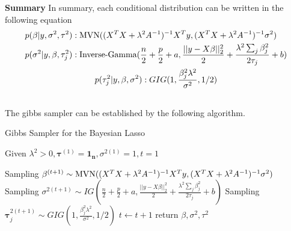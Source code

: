 \textbf{Summary}
In summary, each conditional distribution can be written in the following equation
\begin{equation}
	\label{eq:lassoposteriorsummary}
	\begin{multlined}
		p(\beta |y,\sigma^2,\tau^2): \textnormal{MVN}((X^TX+\lambda^2A^{-1})^{-1}X^Ty,(X^TX+\lambda^2A^{-1})^{-1}\sigma^2)\\
		p(\sigma^2 |y,\beta,\tau_j^2):\textnormal{Inverse-Gamma}(\frac{n}{2}+\frac{p}{2}+a,\frac{||y-X\beta||_2^2}{2}+\frac{\lambda^2\sum_j{\beta_j^2}}{2\tau_j}+b)\\	
		p(\tau_j^2|y,\beta,\sigma^2): GIG(1,\frac{\beta_j^2\lambda^2}{\sigma^2},1/2)\\
	\end{multlined}
\end{equation}
The gibbs sampler can be established by the following algorithm.
\begin{algorithm}
	\caption{Gibbs Sampler for the Bayesian Lasso}
	\begin{algorithmic}[1]
		
		\State Given $\lambda^2>0, \mathbf{\tau}^{(1)} = \mathbf{1_n}, \sigma^{2(1)} =1 , t=1$ 
		
		\State Sampling $\mathbf{\beta}^{(t+1)} \sim \textnormal{MVN}((X^TX+\lambda^2A^{-1})^{-1}X^Ty,(X^TX+\lambda^2A^{-1})^{-1}\sigma^2) $  
		\State Sampling $\sigma^{2(t+1)} \sim IG(\frac{n}{2}+\frac{p}{2}+a,\frac{||y-X\beta||_2^2}{2}+\frac{\lambda^2\sum_j{\beta_j^2}}{2\tau_j}+b)$ 
		\State Sampling $\mathbf{\tau}_j^{2(t+1)} \sim GIG(1,\frac{\beta_j^2\lambda^2}{\sigma^2},1/2)$ 
		\EndFor
		\State $t \leftarrow t + 1$
		\EndWhile  \label{roy's loop}
		\State return $\beta,\sigma^2,\tau^2$
		
		
	\end{algorithmic}
\end{algorithm}

